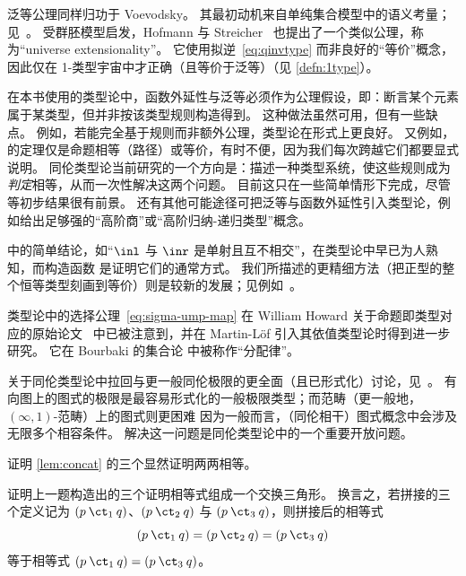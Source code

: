 %
泛等公理同样归功于 Voevodsky。
其最初动机来自单纯集合模型中的语义考量；见~\cite{klv:ssetmodel}。
受群胚模型启发，Hofmann 与 Streicher~\cite{hs:gpd-typethy} 也提出了一个类似公理，称为“universe extensionality”。
它使用拟逆~\eqref{eq:qinvtype} 而非良好的“等价”概念，因此仅在 1-类型宇宙中才正确（且等价于泛等）（见 \cref{defn:1type}）。

在本书使用的类型论中，函数外延性与泛等必须作为公理假设，即：断言某个元素属于某类型，但并非按该类型规则构造得到。
这种做法虽然可用，但有一些缺点。
例如，若能完全基于规则而非额外公理，类型论在形式上更良好。
又例如， 的定理仅是命题相等（路径）或等价，有时不便，因为我们每次跨越它们都要显式说明。
同伦类型论当前研究的一个方向是：描述一种类型系统，使这些规则成为\emph{判定}相等，从而一次性解决这两个问题。
目前这只在一些简单情形下完成，尽管~\cite{lh:canonicity} 等初步结果很有前景。
还有其他可能途径可把泛等与函数外延性引入类型论，例如给出足够强的“高阶商”或“高阶归纳-递归类型”概念。

 中的简单结论，如“$\inl$ 与 $\inr$ 是单射且互不相交”，在类型论中早已为人熟知，而构造函数 \encode 是证明它们的通常方式。
我们所描述的更精细方法（把正型的整个恒等类型刻画到等价）则是较新的发展；见例如~\cite{ls:pi1s1}。

%
类型论中的选择公理~\eqref{eq:sigma-ump-map} 在 William Howard 关于命题即类型对应的原始论文~\cite{howard:pat} 中已被注意到，并在 Martin-L\"of 引入其依值类型论时得到进一步研究。
它在 Bourbaki 的集合论 \cite{Bourbaki} 中被称作“分配律”。%

关于同伦类型论中拉回与更一般同伦极限的更全面（且已形式化）讨论，见~\cite{AKL13}。
有向图上的图式的极限是最容易形式化的一般极限类型；而范畴（更一般地，$(\infty,1)$-范畴）上的图式则更困难
%
%
因为一般而言，（同伦相干）图式概念中会涉及无限多个相容条件。
解决这一问题是同伦类型论中的一个重要开放问题。

\sectionExercises

\begin{ex}\label{ex:basics:concat}
  证明 \cref{lem:concat} 的三个显然证明两两相等。
\end{ex}

\begin{ex}\label{ex:eq-proofs-commute}
  证明上一题构造出的三个证明相等式组成一个交换三角形。
  换言之，若拼接的三个定义记为 $(p \mathbin{\ct_1} q)$、$(p\mathbin{\ct_2} q)$ 与 $(p\mathbin{\ct_3} q)$，则拼接后的相等式
  \[(p\mathbin{\ct_1} q) = (p\mathbin{\ct_2} q) = (p\mathbin{\ct_3} q)\]
  等于相等式 $(p\mathbin{\ct_1} q) = (p\mathbin{\ct_3} q)$。
\end{ex}

